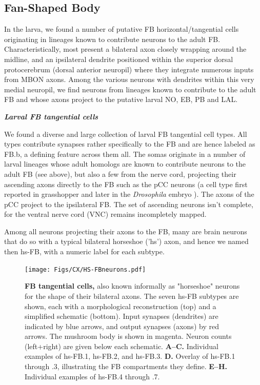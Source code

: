     \subsection{Fan-Shaped Body}

    In the larva, we found a number of putative FB horizontal/tangential cells
    originating in lineages known to contribute neurons to the adult FB. Characteristically, most present a bilateral axon closely wrapping around the midline, and an ipsilateral dendrite positioned within the superior dorsal protocerebrum (dorsal anterior neuropil) where they integrate numerous inputs from MBON axons. Among the various neurons with dendrites within this very medial neuropil, we find neurons from lineages known to contribute to the adult FB and whose axons project to the putative larval NO, EB, PB and LAL.


    \textbf{\textit{Larval FB tangential cells}}


    We found a diverse and large collection of larval FB tangential cell types.
    All types contribute synapses rather specifically to the FB and are hence labeled as FB.b, a defining feature across them all.
    The somas originate in a number of larval lineages whose adult homologs are known to contribute neurons to the adult FB (see above), but also a few from the nerve cord, projecting their ascending axons directly to the FB such as the pCC neurons (a cell type first reported in grasshopper \citep{goodman1984pCC} and later in the \textit{Drosophila} embryo \citep{jacobs1989pCC}). The axons of the pCC project to the ipsilateral FB. The set of ascending neurons isn't complete, for the ventral nerve cord (VNC) remains incompletely mapped.

    Among all neurons projecting their axons to the FB, many are brain neurons that do so with a typical bilateral horseshoe ('hs') axon, and hence we named then hs-FB, with a numeric label for each subtype.

        \begin{figure}
            \centering
            \texttt{[image: Figs/CX/HS-FBneurons.pdf]}
            \caption{\textbf{FB tangential cells,} also known informally as "horseshoe" neurons for the shape of their bilateral axons. The seven hs-FB subtypes are shown, each with a morphological reconstruction (top) and a simplified schematic (bottom). Input synapses (dendrites) are indicated by blue arrows, and output synapses (axons) by red arrows. The mushroom body is shown in magenta. Neuron counts (left+right) are given below each schematic. \textbf{A–C.} Individual examples of hs-FB.1, hs-FB.2, and hs-FB.3. \textbf{D.} Overlay of hs-FB.1 through .3, illustrating the FB compartments they define. \textbf{E–H.} Individual examples of hs-FB.4 through .7.}
        \label{fig:HSFBneurons}
        \end{figure}

